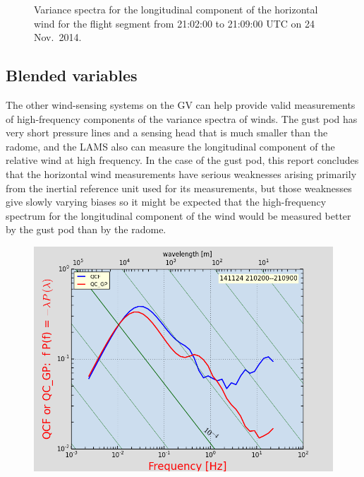 \documentclass[12pt,twoside,english]{article}\usepackage[]{graphicx}\usepackage[]{color}
\let\OrgIndex\index
\renewcommand*{\index}[1]{\OrgIndex{#1}}
\begin{document}
{{\begin{appendices}
\begin{figure}
\protect\protect\protect\caption{\label{fig:AppxB-PSD6}Variance spectra for the longitudinal component of the horizontal wind for the flight segment from 21:02:00 to 21:09:00 UTC on 24 Nov.\ 2014.} 
\end{figure}

\subsection{\textquotedbl{}Blended\textquotedbl{} variables}

The other wind-sensing systems on the GV can help provide valid measurements of high-frequency components of the variance spectra of winds. The gust pod has very short pressure lines and a sensing head that is much smaller than the radome, and the LAMS also can measure the longitudinal component of the relative wind at high frequency. In the case of the gust pod, this report concludes that the horizontal wind measurements have serious weaknesses arising primarily from the inertial reference unit used for its measurements, but those weaknesses give slowly varying biases so it might be expected that the high-frequency spectrum for the longitudinal component of the wind would be measured better by the gust pod than by the radome. 


\begin{figure}
\noindent \begin{centering}
\includegraphics[height=0.4\textheight]{SpecialGraphics/MEMPlotQC.png}  
\par\end{centering}


\end{figure}
\end{appendices}}}
\end{document}
